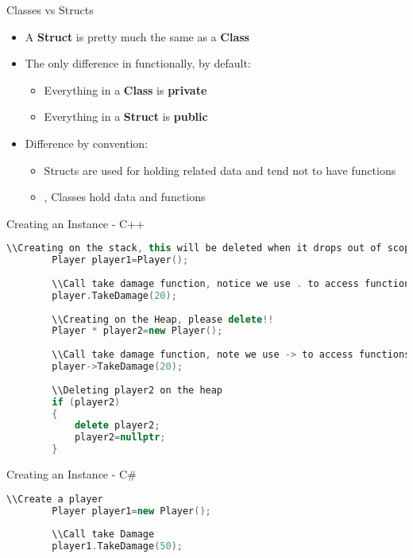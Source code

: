 \begin{frame}{Classes vs Structs}
\begin{itemize}
	\pause \item A \textbf{Struct} is pretty much the same as a \textbf{Class}
	\pause \item The only difference in functionally, by default:
	\begin{itemize}
		\pause \item Everything in a \textbf{Class} is \textbf{private}
		\pause \item Everything in a \textbf{Struct} is \textbf{public}
	\end{itemize}
	\pause \item Difference by convention:
	\begin{itemize}
		\pause \item Structs are used for holding related data and tend not to have functions
		\pause \item, Classes hold data and functions
	\end{itemize}
\end{itemize}
\end{frame}

\begin{frame}[fragile]{Creating an Instance - C++}
	\begin{lstlisting}[language=C++,basicstyle=\tiny,]
		\\Creating on the stack, this will be deleted when it drops out of scope
		Player player1=Player();
		
		\\Call take damage function, notice we use . to access functions
		player.TakeDamage(20);
		
		\\Creating on the Heap, please delete!!
		Player * player2=new Player();
		
		\\Call take damage function, note we use -> to access functions
		player->TakeDamage(20);
		
		\\Deleting player2 on the heap
		if (player2)
		{
			delete player2;
			player2=nullptr;
		}
	\end{lstlisting}
\end{frame}

\begin{frame}[fragile]{Creating an Instance - C\#}
	\begin{lstlisting}[language=C++,basicstyle=\tiny,]
		\\Create a player
		Player player1=new Player();
		
		\\Call take Damage
		player1.TakeDamage(50);
	\end{lstlisting}
\end{frame}

